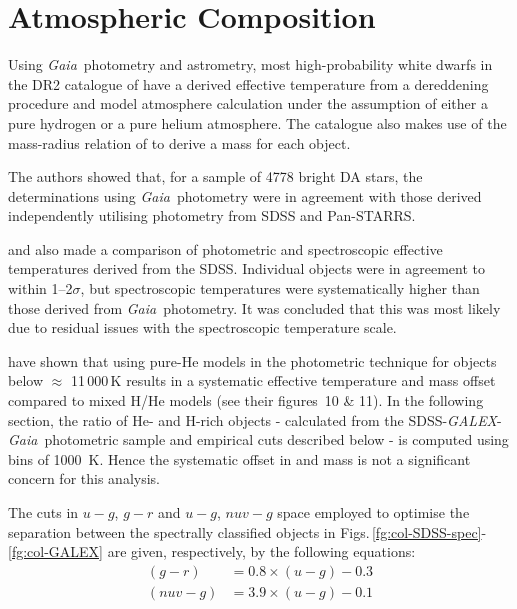 \documentclass[a4paper,fleqn,usenatbib]{mnras}
\newcommand{\gaia}{{\it Gaia}}
\begin{document}
\section{Atmospheric Composition}
\label{sec:model_params}

Using \gaia\ photometry and astrometry, most high-probability white dwarfs in the DR2 catalogue of \citet{ngf19} have a derived effective temperature from a dereddening procedure and model atmosphere calculation under the assumption of either a pure hydrogen or a pure helium atmosphere. The catalogue also makes use of the mass-radius relation of \citet{fontaine01} to derive a mass for each object.

The authors showed that, for a sample of 4778 bright DA stars, the \teff determinations using \gaia\ photometry were in agreement with those derived independently utilising photometry from SDSS and Pan-STARRS. 
 
\citet{tremblay19} and \citet{genest-beaulieu2019a} also made a comparison of photometric and spectroscopic effective temperatures derived from the SDSS. Individual objects were in agreement to within 1--2$\sigma$, but spectroscopic temperatures were systematically higher than those derived from \gaia\ photometry. It was concluded that this was most likely due to residual issues with the spectroscopic temperature scale. 


\cite{bergeron19} have shown that using pure-He models in the photometric technique for objects below \teff $\approx$ 11\,000\,K results in a systematic effective temperature and mass offset compared to mixed H/He models (see their figures~10 \& 11). In the following section, the ratio of He- and H-rich objects - calculated from the SDSS-{\it GALEX}-\gaia\ photometric sample and empirical cuts described below - is computed using \teff bins of 1000~K. Hence the systematic offset in \teff and mass is not a significant concern for this analysis.

The cuts in $u-g$, $g-r$ and $u-g$, $nuv-g$ space employed to optimise the separation between the spectrally classified objects in Figs.\,\ref{fg:col-SDSS-spec}-\ref{fg:col-GALEX} are given, respectively, by the following equations:
\begin{align}
 (g-r) &= 0.8 \times (u-g) - 0.3 		\label{eq:phot_cut_g-r}		\\
 (nuv-g) &= 3.9 \times (u-g) - 0.1	 	\label{eq:phot_cut_nuv-g}
\end{align}
\end{document}
